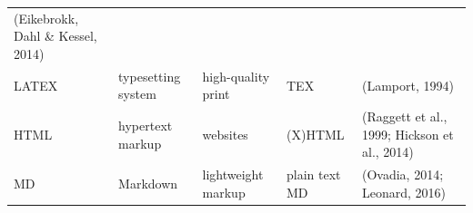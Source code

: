 \documentclass[10pt,fleqn]{wlpeerj}
\begin{document}
\begin{longtable}[]{@{}lllll@{}}
\begin{minipage}[t]{0.28\columnwidth}
(Eikebrokk,
Dahl
\&
Kessel,
2014)\strut
\end{minipage}\tabularnewline
\begin{minipage}[t]{0.08\columnwidth}\raggedright\strut
LATEX\strut
\end{minipage}
&
\begin{minipage}[t]{0.21\columnwidth}\raggedright\strut
typesetting
system\strut
\end{minipage}
&
\begin{minipage}[t]{0.16\columnwidth}\raggedright\strut
high-quality
print\strut
\end{minipage}
&
\begin{minipage}[t]{0.13\columnwidth}\raggedright\strut
TEX\strut
\end{minipage}
&
\begin{minipage}[t]{0.28\columnwidth}\raggedright\strut
(Lamport,
1994)\strut
\end{minipage}\tabularnewline
\begin{minipage}[t]{0.08\columnwidth}\raggedright\strut
HTML\strut
\end{minipage}
&
\begin{minipage}[t]{0.21\columnwidth}\raggedright\strut
hypertext
markup\strut
\end{minipage}
&
\begin{minipage}[t]{0.16\columnwidth}\raggedright\strut
websites\strut
\end{minipage}
&
\begin{minipage}[t]{0.13\columnwidth}\raggedright\strut
(X)HTML\strut
\end{minipage}
&
\begin{minipage}[t]{0.28\columnwidth}\raggedright\strut
(Raggett
et
al.,
1999;
Hickson
et
al.,
2014)\strut
\end{minipage}\tabularnewline
\begin{minipage}[t]{0.08\columnwidth}\raggedright\strut
MD\strut
\end{minipage}
&
\begin{minipage}[t]{0.21\columnwidth}\raggedright\strut
Markdown\strut
\end{minipage}
&
\begin{minipage}[t]{0.16\columnwidth}\raggedright\strut
lightweight
markup\strut
\end{minipage}
&
\begin{minipage}[t]{0.13\columnwidth}\raggedright\strut
plain
text
MD\strut
\end{minipage}
&
\begin{minipage}[t]{0.28\columnwidth}\raggedright\strut
(Ovadia,
2014;
Leonard,
2016)\strut
\end{minipage}\tabularnewline
\bottomrule
\end{longtable}
\end{document}
